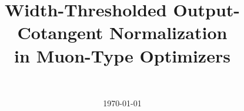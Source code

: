 \documentclass[11pt]{article}
\title{\textbf{Width-Thresholded Output-Cotangent Normalization\\in Muon-Type Optimizers}}
\author{\todo{authors}\\[3pt]{\small \todo{affiliations}}}
\date{\small \today}
\begin{document}
\maketitle



\FloatBarrier

\FloatBarrier



\end{document}
